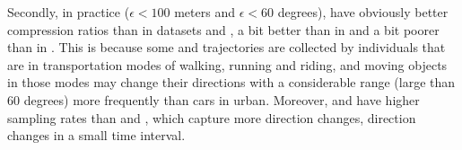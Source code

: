 Secondly, in practice (\eg $\epsilon <100$ meters and $\epsilon < 60$ degrees), \sed have obviously better compression ratios than \dad in datasets \geolife and \mopsi, a bit better than \dad in \taxi and a bit poorer than \dad in \ucar.
This is because some \geolife and \mopsi trajectories are collected by individuals that are in transportation modes of walking, running and riding, and moving objects in those modes may change their directions with a considerable range (\eg large than $60$ degrees) more frequently than cars in urban. Moreover, \geolife and \mopsi have higher sampling rates than \taxi and \ucar, which capture more direction changes, \ie direction changes in a small time interval.







